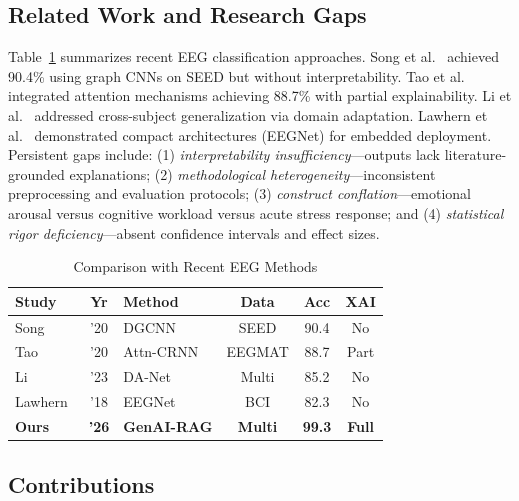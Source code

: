 \documentclass[journal,twoside]{IEEEtran}
\begin{document}
\subsection{Related Work and Research Gaps}

Table~\ref{tab:related} summarizes recent EEG classification approaches. Song et al.~\cite{song2020eeg} achieved 90.4\% using graph CNNs on SEED but without interpretability. Tao et al.~\cite{tao2020attention} integrated attention mechanisms achieving 88.7\% with partial explainability. Li et al.~\cite{li2023domain} addressed cross-subject generalization via domain adaptation. Lawhern et al.~\cite{lawhern2018eegnet} demonstrated compact architectures (EEGNet) for embedded deployment. Persistent gaps include: (1) \textit{interpretability insufficiency}---outputs lack literature-grounded explanations; (2) \textit{methodological heterogeneity}---inconsistent preprocessing and evaluation protocols; (3) \textit{construct conflation}---emotional arousal versus cognitive workload versus acute stress response; and (4) \textit{statistical rigor deficiency}---absent confidence intervals and effect sizes.

\begin{table}[t]
\centering
\caption{Comparison with Recent EEG Methods}
\label{tab:related}
\scriptsize
\begin{tabular}{lclccc}
\toprule
\textbf{Study} & \textbf{Yr} & \textbf{Method} & \textbf{Data} & \textbf{Acc} & \textbf{XAI} \\
\midrule
Song~\cite{song2020eeg} & '20 & DGCNN & SEED & 90.4 & No \\
Tao~\cite{tao2020attention} & '20 & Attn-CRNN & EEGMAT & 88.7 & Part \\
Li~\cite{li2023domain} & '23 & DA-Net & Multi & 85.2 & No \\
Lawhern~\cite{lawhern2018eegnet} & '18 & EEGNet & BCI & 82.3 & No \\
\textbf{Ours} & \textbf{'26} & \textbf{GenAI-RAG} & \textbf{Multi} & \textbf{99.3} & \textbf{Full} \\
\bottomrule
\end{tabular}
\end{table}

\subsection{Contributions}
\end{document}
